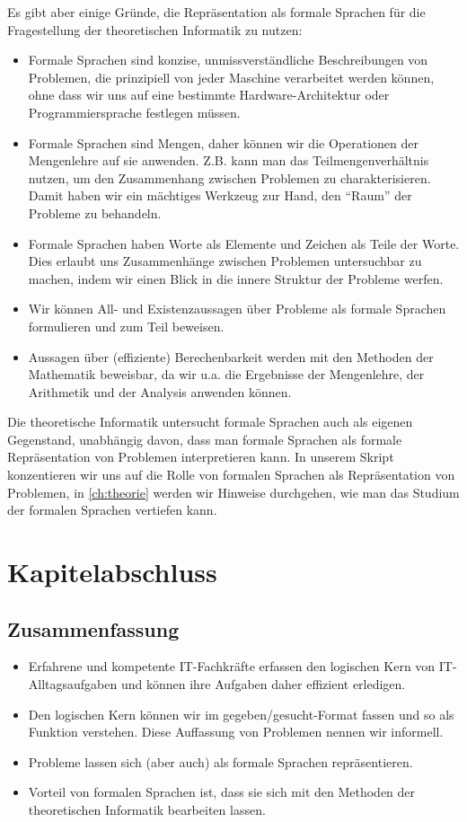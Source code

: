 Es gibt aber einige Gründe,
die Repräsentation als formale Sprachen
für die Fragestellung der theoretischen Informatik zu nutzen:
\begin{itemize}
    \item Formale Sprachen sind konzise, unmissverständliche Beschreibungen von Problemen,
        die prinzipiell von jeder Maschine verarbeitet werden können,
        ohne dass wir uns auf eine bestimmte Hardware-Architektur oder Programmiersprache
        festlegen müssen.
    \item Formale Sprachen sind Mengen, daher können wir die Operationen der Mengenlehre
        auf sie anwenden.
        Z.B. kann man das Teilmengenverhältnis nutzen,
        um den Zusammenhang zwischen Problemen zu charakterisieren.
        Damit haben wir ein mächtiges Werkzeug zur Hand,
        den ``Raum'' der Probleme zu behandeln.
    \item Formale Sprachen haben Worte als Elemente und Zeichen als Teile der Worte.
        Dies erlaubt uns Zusammenhänge zwischen Problemen untersuchbar zu machen,
        indem wir einen Blick in die innere Struktur der Probleme werfen.
    \item Wir können All- und Existenzaussagen über Probleme als formale Sprachen formulieren
        und zum Teil beweisen.
    \item Aussagen über (effiziente) Berechenbarkeit werden mit den Methoden der Mathematik
        beweisbar, da wir u.a. die Ergebnisse der Mengenlehre, der Arithmetik
        und der Analysis anwenden können.
\end{itemize}

Die theoretische Informatik untersucht formale Sprachen auch als eigenen Gegenstand,
unabhängig davon, dass man formale Sprachen als formale Repräsentation von Problemen
interpretieren kann.
In unserem Skript konzentieren wir uns auf die Rolle von formalen Sprachen als
Repräsentation von Problemen,
in \autoref{ch:theorie} werden wir Hinweise durchgehen,
wie man das Studium der formalen Sprachen vertiefen kann.

\section*{Kapitelabschluss}
\subsection*{Zusammenfassung}
\begin{itemize}
    \item Erfahrene und kompetente IT-Fachkräfte erfassen den logischen Kern
        von IT-Alltagsaufgaben und können ihre Aufgaben daher effizient erledigen.
    \item Den logischen Kern können wir im gegeben/gesucht-Format fassen
        und so als Funktion verstehen. Diese Auffassung von Problemen nennen wir informell.
    \item Probleme lassen sich (aber auch) als formale Sprachen repräsentieren.
    \item Vorteil von formalen Sprachen ist, dass sie sich mit den Methoden der theoretischen Informatik
        bearbeiten lassen.
\end{itemize}
